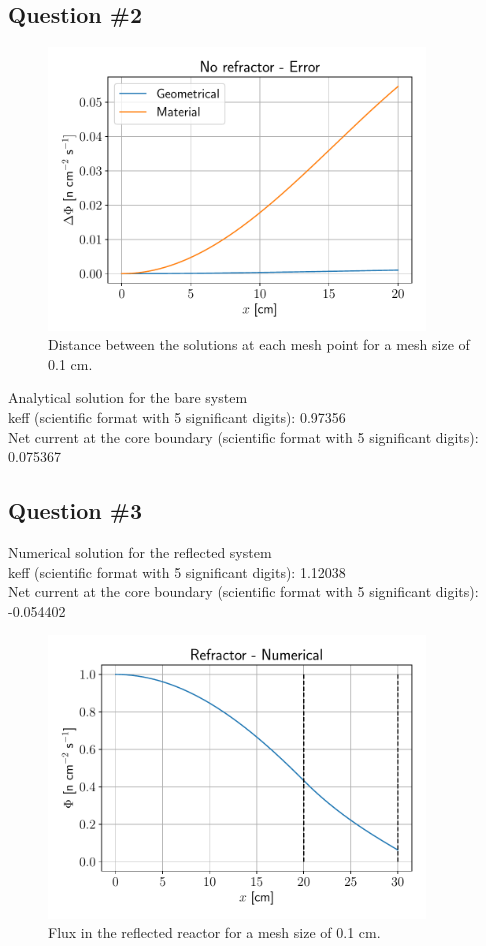 \documentclass[11pt,a4paper]{article}
\begin{document}
\subsection{Question \#2}
\begin{figure}[H]
	\includegraphics[width=10cm]{fig/Ex2_Q2.pdf}
	\centering
	\caption{Distance between the solutions at each mesh point for a mesh size of 0.1 cm.}
\end{figure}
Analytical solution for the bare system \\
keff (scientific format with 5 significant digits): 0.97356 \\
Net current at the core boundary (scientific format with 5 significant digits): 0.075367 \\

\subsection{Question \#3}
Numerical solution for the reflected system \\
keff (scientific format with 5 significant digits): 1.12038 \\
Net current at the core boundary (scientific format with 5 significant digits): -0.054402 \\
\begin{figure}[H]
	\includegraphics[width=10cm]{fig/Ex2_Q3.pdf}
	\centering
	\caption{Flux in the reflected reactor for a mesh size of 0.1 cm.}
\end{figure}
\end{document}
